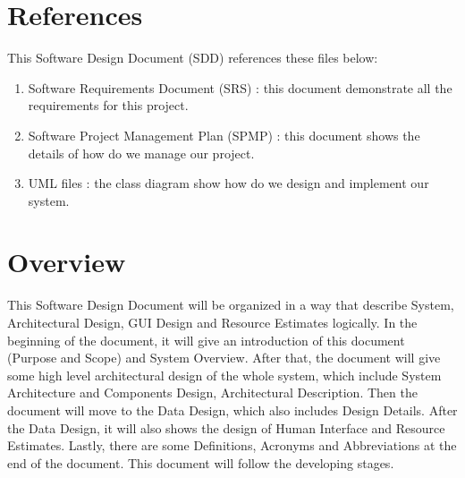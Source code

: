 \documentclass[11pt, a4paper]{report}
\begin{document}
\section{References}
This Software Design Document (SDD) references these files below:
\begin{enumerate}

  \item Software Requirements Document (SRS) : this document demonstrate all the requirements for this project.

  \item Software Project Management Plan (SPMP) : this document shows the details of how do we manage our project.

  \item UML files : the class diagram show how do we design and implement our system.

\end{enumerate}


\section{Overview}
This Software Design Document will be organized in a way that describe System, Architectural Design, GUI Design and Resource Estimates logically. In the beginning of the document, it will give an introduction of this document (Purpose and Scope) and System Overview. After that, the document will give some high level architectural design of the whole system, which include System Architecture and Components Design, Architectural Description. Then the document will move to the Data Design, which also includes Design Details. After the Data Design, it will also shows the design of Human Interface and Resource Estimates. Lastly, there are some Definitions, Acronyms and Abbreviations at the end of the document. This document will follow the developing stages.
\end{document}
